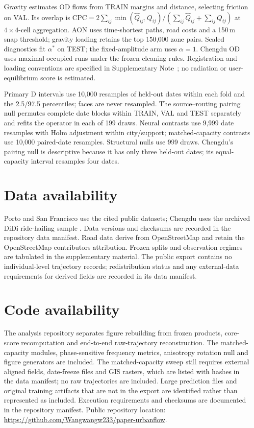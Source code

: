 \documentclass[11pt]{article}
\newcommand{\repositorylocation}{\url{https://github.com/Wangwangw233/paper-urbanflow}}
\begin{document}
Gravity estimates OD flows from TRAIN margins and distance, selecting friction on VAL. Its overlap is $\mathrm{CPC}=2\sum_{ij}\min(\widehat Q_{ij},Q_{ij})/(\sum_{ij}\widehat Q_{ij}+\sum_{ij}Q_{ij})$ at $4\times4$-cell aggregation. AON uses time-shortest paths, road costs and a 150\,m snap threshold; gravity loading retains the top 150,000 zone pairs. Scaled diagnostics fit $\alpha^*$ on TEST; the fixed-amplitude arm uses $\alpha=1$. Chengdu OD uses maximal occupied runs under the frozen cleaning rules. Registration and loading conventions are specified in Supplementary Note~; no radiation or user-equilibrium score is estimated.

Primary D intervals use 10,000 resamples of held-out dates within each fold and the 2.5/97.5 percentiles; faces are never resampled. The source--routing pairing null permutes complete date blocks within TRAIN, VAL and TEST separately and refits the operator in each of 199 draws. Neural contrasts use 9,999 date resamples with Holm adjustment within city/support; matched-capacity contrasts use 10,000 paired-date resamples. Structural nulls use 999 draws. Chengdu's pairing null is descriptive because it has only three held-out dates; its equal-capacity interval resamples four dates.

\section*{Data availability}
Porto and San Francisco use the cited public datasets; Chengdu uses the archived DiDi ride-hailing sample \cite{didi2014chengdu}. Data versions and checksums are recorded in the repository data manifest. Road data derive from OpenStreetMap and retain the OpenStreetMap contributors attribution. Frozen splits and observation regimes are tabulated in the supplementary material. The public export contains no individual-level trajectory records; redistribution status and any external-data requirements for derived fields are recorded in its data manifest.
\section*{Code availability}
The analysis repository separates figure rebuilding from frozen products, core-score recomputation and end-to-end raw-trajectory reconstruction. The matched-capacity modules, phase-sensitive frequency metrics, anisotropy rotation null and figure generators are included. The matched-capacity sweep still requires external aligned fields, date-freeze files and GIS rasters, which are listed with hashes in the data manifest; no raw trajectories are included. Large prediction files and original training artifacts that are not in the export are identified rather than represented as included. Execution requirements and checksums are documented in the repository manifest. Public repository location: \repositorylocation.
\end{document}
